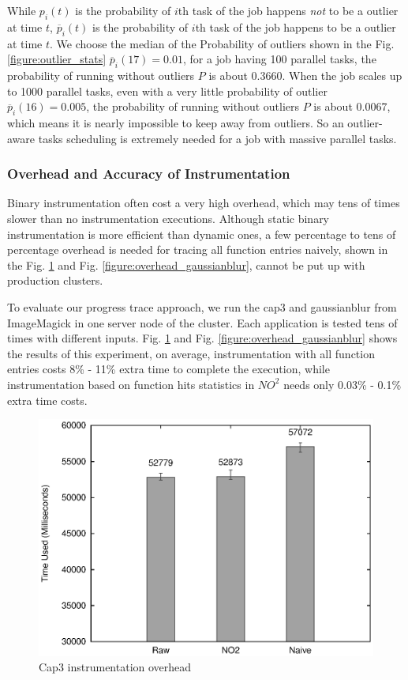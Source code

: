 While $p_i(t)$ is the probability of $i$th task of the job happens \emph{not} to be a outlier at time $t$, $\overline{p}_i(t)$ is the probability of $i$th task of the job happens to be a outlier at time $t$. We choose the median of the Probability of outliers shown in the Fig. \ref{figure:outlier_stats} $\overline{p}_i(17) = 0.01$, for a job having 100 parallel tasks, the probability of running without outliers $P$ is about 0.3660. When the job scales up to 1000 parallel tasks, even with a very little probability of outlier $\overline{p}_i(16) = 0.005$, the probability of running without outliers $P$ is about 0.0067, which means it is nearly impossible to keep away from outliers. So an outlier-aware tasks scheduling is extremely needed for a job with massive parallel tasks.

\subsubsection{Overhead and Accuracy of Instrumentation}

Binary instrumentation often cost a very high overhead, which may tens of times slower than no instrumentation executions. Although static binary instrumentation is more efficient than dynamic ones, a few percentage to tens of percentage overhead is needed for tracing all function entries naively, shown in the Fig. \ref{figure:overhead_cap3} and Fig. \ref{figure:overhead_gaussianblur}, cannot be put up with production clusters.

To evaluate our progress trace approach, we run the cap3 and gaussianblur from ImageMagick in one server node of the cluster. Each application is tested tens of times with different inputs. Fig. \ref{figure:overhead_cap3} and Fig. \ref{figure:overhead_gaussianblur} shows the results of this experiment, on average, instrumentation with all function entries costs 8\% - 11\% extra time to complete the execution, while instrumentation based on function hits statistics in $NO^2$ needs only 0.03\% - 0.1\% extra time costs.

\begin{figure}
\centering
  \includegraphics[width=0.9\columnwidth]{figures/overhead_cap3.eps}
\caption{Cap3 instrumentation overhead}
\label{figure:overhead_cap3}
\end{figure}

